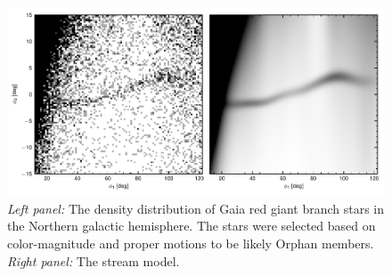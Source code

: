 \documentclass[a4paper,useAMS,usenatbib]{mnras}
\begin{document}
\begin{figure}
  \centering
  \includegraphics{gaia_fit_plot.pdf}
  \caption[]{{\it Left panel:} The density distribution of Gaia red giant branch  stars in the Northern galactic hemisphere. The stars were selected based on color-magnitude and proper motions to be likely Orphan members. {\it Right panel:} The stream model.  }
   \label{fig:gaia_rgb}
\end{figure}
\end{document}
